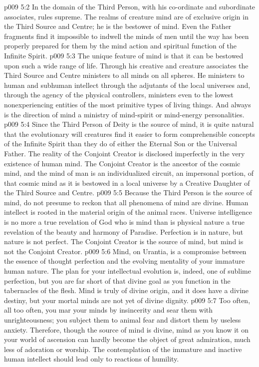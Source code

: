 \vs p009 5:2 In the domain of  the Third Person, with his co\hyp{}ordinate and subordinate associates, rules supreme. The realms of creature mind are of exclusive origin in the Third Source and Centre; he is the bestower of mind. Even the Father fragments find it impossible to indwell the minds of men until the way has been properly prepared for them by the mind action and spiritual function of the Infinite Spirit.
\vs p009 5:3 The unique feature of mind is that it can be bestowed upon such a wide range of life. Through his creative and creature associates the Third Source and Centre ministers to all minds on all spheres. He ministers to human and subhuman intellect through the adjutants of the local universes and, through the agency of the physical controllers, ministers even to the lowest nonexperiencing entities of the most primitive types of living things. And always is the direction of mind a ministry of mind\hyp{}spirit or mind\hyp{}energy personalities.
\vs p009 5:4 \pc Since the Third Person of Deity is the source of mind, it is quite natural that the evolutionary will creatures find it easier to form comprehensible concepts of the Infinite Spirit than they do of either the Eternal Son or the Universal Father. The reality of the Conjoint Creator is disclosed imperfectly in the very existence of human mind. The Conjoint Creator is the ancestor of the cosmic mind, and the mind of man is an individualized circuit, an impersonal portion, of that cosmic mind as it is bestowed in a local universe by a Creative Daughter of the Third Source and Centre.
\vs p009 5:5 \pc Because the Third Person is the source of mind, do not presume to reckon that all phenomena of mind are divine. Human intellect is rooted in the material origin of the animal races. Universe intelligence is no more a true revelation of God who is mind than is physical nature a true revelation of the beauty and harmony of Paradise. Perfection is in nature, but nature is not perfect. The Conjoint Creator is the source of mind, but mind is not the Conjoint Creator.
\vs p009 5:6 Mind, on Urantia, is a compromise between the essence of thought perfection and the evolving mentality of your immature human nature. The plan for your intellectual evolution is, indeed, one of sublime perfection, but you are far short of that divine goal as you function in the tabernacles of the flesh. Mind is truly of divine origin, and it does have a divine destiny, but your mortal minds are not yet of divine dignity.
\vs p009 5:7 Too often, all too often, you mar your minds by insincerity and sear them with unrighteousness; you subject them to animal fear and distort them by useless anxiety. Therefore, though the source of mind is divine, mind as you know it on your world of ascension can hardly become the object of great admiration, much less of adoration or worship. The contemplation of the immature and inactive human intellect should lead only to reactions of humility.
